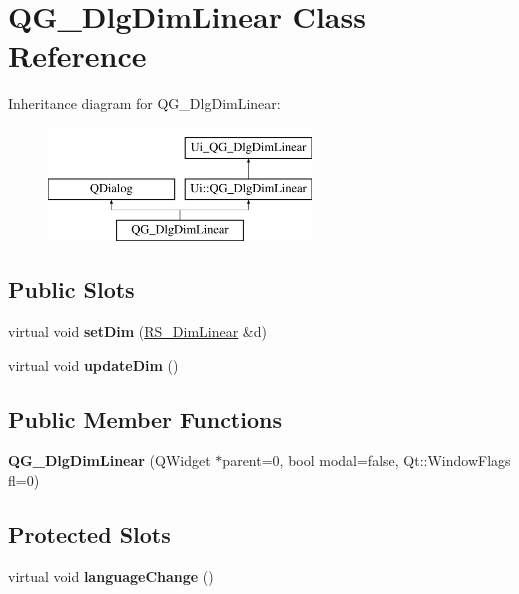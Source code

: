 \hypertarget{classQG__DlgDimLinear}{\section{Q\-G\-\_\-\-Dlg\-Dim\-Linear Class Reference}
\label{classQG__DlgDimLinear}
}
Inheritance diagram for Q\-G\-\_\-\-Dlg\-Dim\-Linear\-:\begin{figure}[H]
\begin{center}
\leavevmode
\includegraphics[height=3.000000cm]{classQG__DlgDimLinear}
\end{center}
\end{figure}
\subsection*{Public Slots}
\begin{DoxyCompactItemize}
\item 
\hypertarget{classQG__DlgDimLinear_a5d8b1011e2a7947f9ec0f63a821ca8f6}{virtual void {\bfseries set\-Dim} (\hyperlink{classRS__DimLinear}{R\-S\-\_\-\-Dim\-Linear} \&d)}\label{classQG__DlgDimLinear_a5d8b1011e2a7947f9ec0f63a821ca8f6}

\item 
\hypertarget{classQG__DlgDimLinear_a51c05084dd20598b46ce7db342deba60}{virtual void {\bfseries update\-Dim} ()}\label{classQG__DlgDimLinear_a51c05084dd20598b46ce7db342deba60}

\end{DoxyCompactItemize}
\subsection*{Public Member Functions}
\begin{DoxyCompactItemize}
\item 
\hypertarget{classQG__DlgDimLinear_a23699bdee3bd67d77ebb2e1ef598d452}{{\bfseries Q\-G\-\_\-\-Dlg\-Dim\-Linear} (Q\-Widget $\ast$parent=0, bool modal=false, Qt\-::\-Window\-Flags fl=0)}\label{classQG__DlgDimLinear_a23699bdee3bd67d77ebb2e1ef598d452}

\end{DoxyCompactItemize}
\subsection*{Protected Slots}
\begin{DoxyCompactItemize}
\item 
\hypertarget{classQG__DlgDimLinear_aea305f21886bbe0d73668e3a1614f093}{virtual void {\bfseries language\-Change} ()}\label{classQG__DlgDimLinear_aea305f21886bbe0d73668e3a1614f093}

\end{DoxyCompactItemize}
